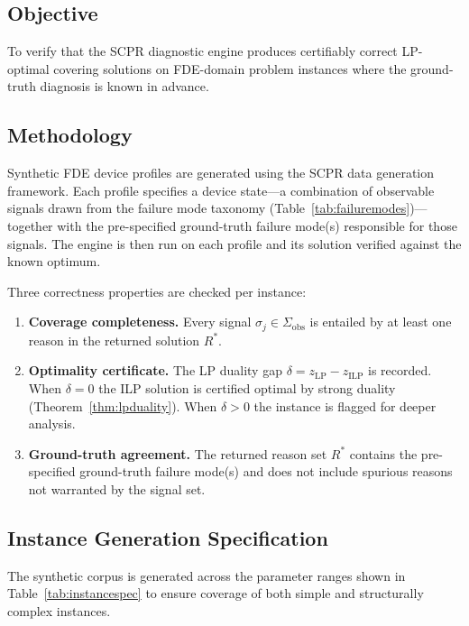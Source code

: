 \documentclass[11pt,a4paper]{report}
\begin{document}
\subsection{Objective}

To verify that the SCPR diagnostic engine produces certifiably correct LP-optimal covering
solutions on FDE-domain problem instances where the ground-truth diagnosis is known in
advance.

\subsection{Methodology}

Synthetic FDE device profiles are generated using the SCPR data generation framework.
Each profile specifies a device state---a combination of observable signals drawn from the
failure mode taxonomy (Table~\ref{tab:failuremodes})---together with the pre-specified
ground-truth failure mode(s) responsible for those signals. The engine is then run on each
profile and its solution verified against the known optimum.

Three correctness properties are checked per instance:

\begin{enumerate}[label=\textbf{C\arabic*.}]
  \item \textbf{Coverage completeness.} Every signal $\sigma_j \in \Sigma_{\mathrm{obs}}$
    is entailed by at least one reason in the returned solution $R^*$.
  \item \textbf{Optimality certificate.} The LP duality gap
    $\delta = z_{\mathrm{LP}} - z_{\mathrm{ILP}}$ is recorded. When $\delta = 0$ the ILP
    solution is certified optimal by strong duality (Theorem~\ref{thm:lpduality}). When
    $\delta > 0$ the instance is flagged for deeper analysis.
  \item \textbf{Ground-truth agreement.} The returned reason set $R^*$ contains the
    pre-specified ground-truth failure mode(s) and does not include spurious reasons not
    warranted by the signal set.
\end{enumerate}

\subsection{Instance Generation Specification}

The synthetic corpus is generated across the parameter ranges shown in
Table~\ref{tab:instancespec} to ensure coverage of both simple and structurally complex
instances.
\end{document}
